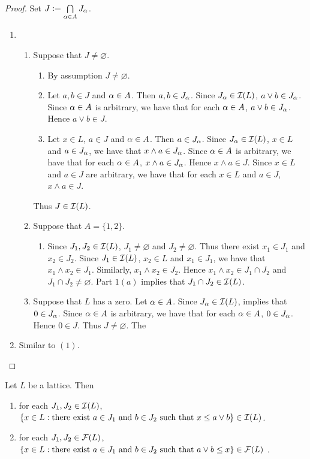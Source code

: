 \documentclass{book}
\begin{document}
	\begin{proof} Set $J \vcentcolon= \bigcap\limits_{\alpha \in A} J_{\alpha}$.
		\begin{enumerate}
			\item 
			\begin{enumerate}
				\item Suppose that $J \neq \varnothing$.
				\begin{enumerate}
					\item By assumption $J \neq \varnothing$.
					\item Let $a, b \in J$ and $\alpha \in A$. Then $a,b \in J_{\alpha}$. Since $J_{\alpha} \in \mathcal{I}(L)$, $a \vee b \in J_{\alpha}$. Since $\alpha \in A$ is arbitrary, we have that for each $\alpha \in A$, $a \vee b \in J_{\alpha}$. Hence $a \vee b \in J$.
					\item Let $x \in L$, $a \in J$ and $\alpha \in A$. Then $a \in J_{\alpha}$. Since $J_{\alpha} \in \mathcal{I}(L)$, $x \in L$ and $a \in J_{\alpha}$, we have that $x \wedge a \in J_{\alpha}$. Since $\alpha \in A$ is arbitrary, we have that for each $\alpha \in A$, $x \wedge a \in J_{\alpha}$. Hence $x \wedge a \in J$. Since $x \in L$ and $a \in J$ are arbitrary, we have that for each $x \in L$ and $a \in J$, $x \wedge a \in J$. 
				\end{enumerate}
				Thus $J \in \mathcal{I}(L)$.
				\item Suppose that $A = \{1,2\}$. 
				\begin{enumerate}
					\item Since $J_1, J_2 \in \mathcal{I}(L)$, $J_1 \neq \varnothing$ and $J_2 \neq \varnothing$. Thus there exist $x_1 \in J_1$ and $x_2 \in J_2$. Since $J_1 \in \mathcal{I}(L)$, $x_2 \in L$ and $x_1 \in J_1$, we have that $x_1 \wedge x_2 \in J_1$. Similarly, $x_1 \wedge x_2 \in J_2$. Hence $x_1 \wedge x_2 \in J_1 \cap J_2$ and $J_1 \cap J_2 \neq \varnothing$. Part $1(a)$ implies that $J_1 \cap J_2 \in \mathcal{I}(L)$.
				\end{enumerate}
				\item Suppose that $L$ has a zero. Let $\alpha \in A$. Since $J_{\alpha} \in \mathcal{I}(L)$,  implies that $0 \in J_{\alpha}$. Since $\alpha \in A$ is arbitrary, we have that for each $\alpha \in A$, $0 \in J_{\alpha}$. Hence $0 \in J$. Thus $J \neq \varnothing$. The 
			\end{enumerate}
			\item Similar to $(1)$.
		\end{enumerate}
	\end{proof}
	
	\begin{ex}
		Let $L$ be a lattice. Then 
		\begin{enumerate}
			\item for each $J_1, J_2 \in \mathcal{I}(L)$, $\{x \in L: \text{there exist $a \in J_1$ and $b \in J_2$ such that $x \leq a \vee b$} \} \in \mathcal{I}(L)$.
			\item for each $J_1, J_2 \in \mathcal{F}(L)$, $\{x \in L: \text{there exist $a \in J_1$ and $b \in J_2$ such that $a \vee b \leq x$} \} \in \mathcal{F}(L)$ .
		\end{enumerate}
	\end{ex}
	
\end{document}
